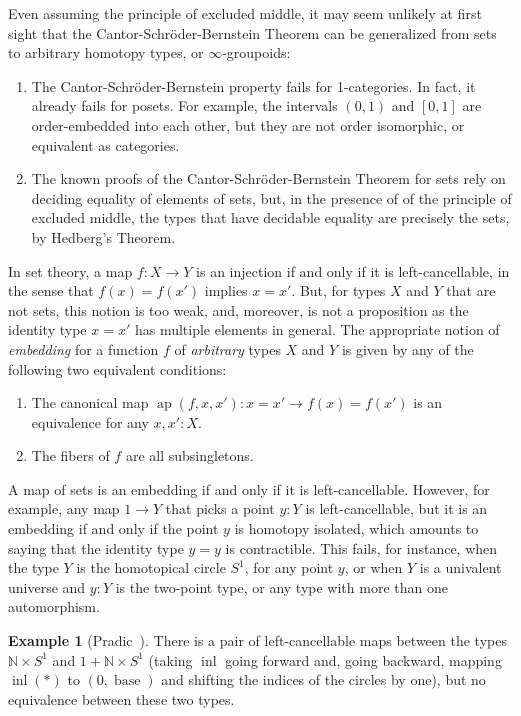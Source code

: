 \documentclass{article}
\theoremstyle{definition}
\newtheorem{example}[theorem]{Example}
\begin{document}
Even assuming the principle of excluded middle, it may seem unlikely
at first sight that the Cantor-Schr\"oder-Bernstein Theorem can be
generalized from sets to arbitrary homotopy types, or
$\infty$-groupoids:
\begin{enumerate}
 	\item The Cantor-Schr\"oder-Bernstein property fails for 1-categories.
In fact, it already fails for posets. For example, the intervals $(0,1)$ and $[0,1]$ are order-embedded into each other, but they are not order isomorphic, or equivalent as categories.
\item The known proofs of the Cantor-Schr\"oder-Bernstein Theorem for
  sets rely on deciding equality of elements of sets, but, in the
  presence of of the principle of excluded middle, the types that have
  decidable equality are precisely the sets, by Hedberg's Theorem.
\end{enumerate}
In set theory, a map $f : X \to Y$ is an injection if and only if it is left-cancellable, in the sense that $f(x)=f(x')$ implies $x=x'$. But, for types $X$ and $Y$ that are not sets, this notion is too weak, and, moreover, is not a proposition as the identity type $x = x'$ has multiple elements in general. The appropriate notion of \emph{embedding} for a function $f$ of \emph{arbitrary} types $X$ and $Y$ is given by any of the following two equivalent conditions:
\begin{enumerate}
\item The canonical map
  $\operatorname{ap}(f,x,x') : x = x' \to f(x) = f(x')$ is an
  equivalence for any $x,x':X$.
 	\item The fibers of $f$ are all subsingletons.
\end{enumerate}

A map of sets is an embedding if and only if it is left-cancellable. However, for example, any map $1 \to Y$ that picks a point $y:Y$ is left-cancellable, but it is an embedding if and only if the point $y$ is homotopy isolated, which amounts to saying that the identity type $y = y$ is contractible. This fails, for instance, when the type $Y$ is the homotopical circle $S^1$, for any point $y$, or when $Y$ is a univalent universe and $y:Y$ is the two-point type, or any type with more than one automorphism.

\begin{example}[Pradic~\cite{pradic:example}]
  There is a pair of left-cancellable maps between the types
  $\mathbb{N} \times S^1$ and $1 + \mathbb{N} \times S^1$ (taking
  $\operatorname{inl}$ going forward and, going backward, mapping
  $\operatorname{inl}(*)$ to $(0, \operatorname{base})$ and shifting
  the indices of the circles by one), but no equivalence between these
  two types.
\end{example}
\end{document}

